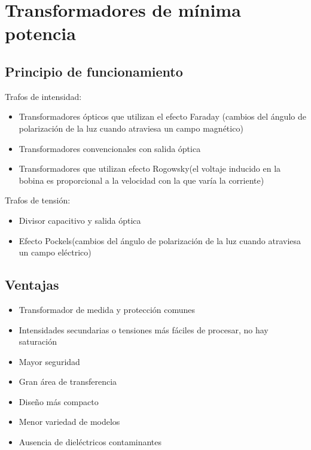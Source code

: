 \section{Transformadores de mínima potencia}
\subsection{Principio de funcionamiento}
Trafos de intensidad:
\begin{itemize}
	\item Transformadores ópticos que utilizan el efecto Faraday
	(cambios del ángulo de polarización de la luz cuando atraviesa un campo magnético)
	\item Transformadores convencionales con salida óptica
	\item Transformadores que utilizan efecto Rogowsky(el voltaje inducido en la bobina es proporcional a la velocidad con la que varía la corriente)
\end{itemize}
Trafos de tensión:
\begin{itemize}
	\item Divisor capacitivo y salida óptica
	\item Efecto Pockels(cambios del ángulo de polarización de la luz cuando atraviesa un campo eléctrico)
\end{itemize}
\subsection{Ventajas}
\begin{itemize}
	\item Transformador de medida y protección comunes
	\item Intensidades secundarias o tensiones más fáciles de procesar, no hay saturación
	\item Mayor seguridad
	\item Gran área de transferencia
	\item Diseño más compacto
	\item Menor variedad de modelos
	\item Ausencia de dieléctricos contaminantes
\end{itemize}